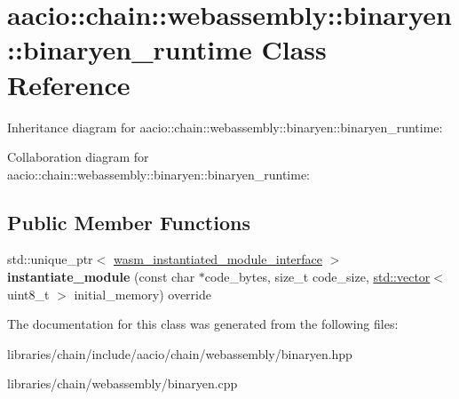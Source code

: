\hypertarget{classaacio_1_1chain_1_1webassembly_1_1binaryen_1_1binaryen__runtime}{}\section{aacio\+:\+:chain\+:\+:webassembly\+:\+:binaryen\+:\+:binaryen\+\_\+runtime Class Reference}
\label{classaacio_1_1chain_1_1webassembly_1_1binaryen_1_1binaryen__runtime}


Inheritance diagram for aacio\+:\+:chain\+:\+:webassembly\+:\+:binaryen\+:\+:binaryen\+\_\+runtime\+:


Collaboration diagram for aacio\+:\+:chain\+:\+:webassembly\+:\+:binaryen\+:\+:binaryen\+\_\+runtime\+:
\subsection*{Public Member Functions}
\begin{DoxyCompactItemize}
\item 
\mbox{\label{classaacio_1_1chain_1_1webassembly_1_1binaryen_1_1binaryen__runtime_a19777339a57520248c5eee4a19b728a5}} 
std\+::unique\+\_\+ptr$<$ \mbox{\hyperlink{classaacio_1_1chain_1_1wasm__instantiated__module__interface}{wasm\+\_\+instantiated\+\_\+module\+\_\+interface}} $>$ {\bfseries instantiate\+\_\+module} (const char $\ast$code\+\_\+bytes, size\+\_\+t code\+\_\+size, \mbox{\hyperlink{classstd_1_1vector}{std\+::vector}}$<$ uint8\+\_\+t $>$ initial\+\_\+memory) override
\end{DoxyCompactItemize}


The documentation for this class was generated from the following files\+:\begin{DoxyCompactItemize}
\item 
libraries/chain/include/aacio/chain/webassembly/binaryen.\+hpp\item 
libraries/chain/webassembly/binaryen.\+cpp\end{DoxyCompactItemize}
